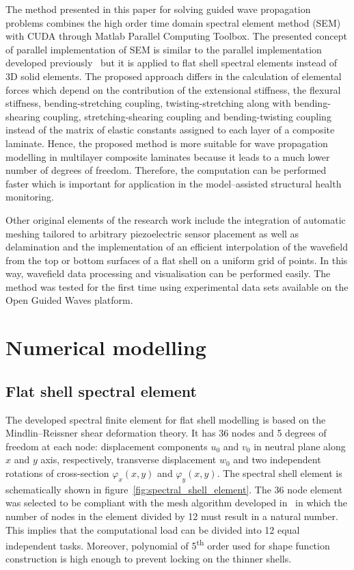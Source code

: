 The method presented in this paper for solving guided wave propagation problems combines the high order time domain spectral element method (SEM) with CUDA through Matlab Parallel Computing Toolbox. The presented concept of parallel implementation of SEM is similar to the parallel implementation developed previously~\cite{Kudela2016} but it is applied to flat shell spectral elements instead of 3D solid elements. The proposed approach differs in the calculation of elemental forces which depend on the contribution of the extensional stiffness, the flexural stiffness, bending-stretching coupling,  twisting-stretching along with bending-shearing coupling, stretching-shearing coupling and bending-twisting coupling instead of the matrix of elastic constants assigned to each layer of a composite laminate. Hence, the proposed method is more suitable for wave propagation modelling in multilayer composite laminates because it leads to a much lower number of degrees of freedom. Therefore, the computation can be performed faster which is important for application in the model--assisted structural health monitoring. 

Other original elements of the research work include the integration of automatic meshing tailored to arbitrary piezoelectric sensor placement as well as delamination and the implementation of an efficient interpolation of the wavefield from the top or bottom surfaces of a flat shell on a uniform grid of points. In this way, wavefield data processing and visualisation can be performed easily. The method was tested for the first time using experimental data sets available on the Open Guided Waves platform.


\section{Numerical modelling}

\subsection{Flat shell spectral element}

The developed spectral finite element for flat shell modelling is based on the Mindlin--Reissner   shear deformation theory. It has 36 nodes and 5 degrees of freedom at each node: displacement components \(u_0\) and \(v_0\) in neutral plane along \(x\) and \(y\) axis, respectively, transverse displacement \(w_0\) and two independent rotations of cross-section \(\varphi_x(x,y)\) and \(\varphi_y(x,y)\). The spectral shell element is schematically shown in figure~\ref{fig:spectral_shell_element}. The 36 node element was selected to be compliant with the mesh   algorithm developed in~\cite{Kudela2016} in which the number of nodes in the element divided by 12 must result in a natural number. This implies that the computational load can be divided into 12 equal independent tasks. Moreover,  polynomial of 5\textsuperscript{th} order used for shape function construction is high enough to prevent locking on the thinner shells.

